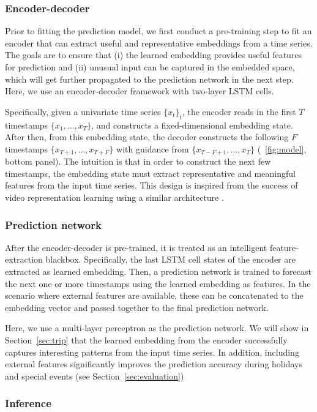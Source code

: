 \documentclass[conference,compsoc,final]{IEEEtran}
\begin{document}
\subsubsection{Encoder-decoder}
Prior to fitting the prediction model, we first conduct a pre-training step to fit an encoder that can extract useful and representative embeddings from a time series. The goals are to ensure that (i) the learned embedding provides useful features for prediction and (ii) unusual input can be captured in the embedded space, which will get further propagated to the prediction network in the next step. 
Here, we use an encoder-decoder framework with two-layer LSTM cells. 

Specifically, given a univariate time series $\{x_t\}_t$, the encoder reads in the first $T$ timestamps $\{x_1, ..., x_T\}$, and constructs a fixed-dimensional embedding state. After then, from this embedding state, the decoder constructs the following $F$ timestamps $\{x_{T+1}, ..., x_{T+F}\}$ with guidance from $\{x_{T-F+1}, ..., x_T\}$ (\figurename~\ref{fig:model}, bottom panel).
The intuition is that in order to construct the next few timestamps, the embedding state must extract representative and meaningful features from the input time series.
This design is inspired from the success of video representation learning using a similar architecture \cite{srivastava2015unsupervised}.

\subsubsection{Prediction network}
After the encoder-decoder is pre-trained, it is treated as an intelligent feature-extraction blackbox. Specifically, the last LSTM cell states of the encoder are extracted as learned embedding. Then, a prediction network is trained to forecast  the next one or more timestamps using the learned embedding as features. In the scenario where external features are available, these can be concatenated to the embedding vector and passed together to the final prediction network.

Here, we use a multi-layer perceptron as the prediction network. We will show in Section~\ref{sec:trip} that the learned embedding from the encoder successfully captures interesting patterns from the input time series. In addition, including external features significantly improves the prediction accuracy during holidays and special events (see Section~\ref{sec:evaluation})


\subsubsection{Inference}
\end{document}
